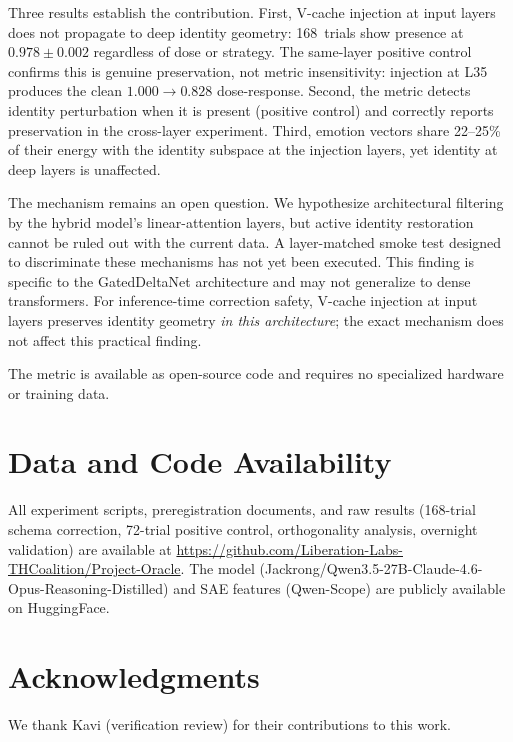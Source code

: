 \documentclass[11pt,a4paper]{article}
\begin{document}
Three results establish the contribution. First, V-cache injection at
input layers does not propagate to deep identity geometry: 168~trials
show presence at $0.978 \pm 0.002$ regardless of dose or strategy.
The same-layer positive control confirms this is genuine preservation,
not metric insensitivity: injection at L35 produces the clean
$1.000 \to 0.828$ dose-response. Second, the metric detects identity
perturbation when it is present (positive control) and correctly reports
preservation in the cross-layer experiment. Third, emotion vectors
share 22--25\% of their energy with the identity subspace at the
injection layers, yet identity at deep layers is unaffected.

The mechanism remains an open question. We hypothesize architectural
filtering by the hybrid model's linear-attention layers, but active
identity restoration cannot be ruled out with the current data. A
layer-matched smoke test designed to discriminate these mechanisms has
not yet been executed. This finding is specific to the GatedDeltaNet
architecture and may not generalize to dense transformers. For
inference-time correction safety, V-cache injection at input layers
preserves identity geometry \emph{in this architecture}; the exact
mechanism does not affect this practical finding.

The metric is available as open-source code and requires no specialized
hardware or training data.

\section*{Data and Code Availability}

All experiment scripts, preregistration documents, and raw results
(168-trial schema correction, 72-trial positive control, orthogonality
analysis, overnight validation) are available at
\url{https://github.com/Liberation-Labs-THCoalition/Project-Oracle}.
The model (Jackrong/Qwen3.5-27B-Claude-4.6-Opus-Reasoning-Distilled) and
SAE features (Qwen-Scope) are publicly available on HuggingFace.

\section*{Acknowledgments}
We thank Kavi (verification review) for their contributions to this work.



\end{document}
